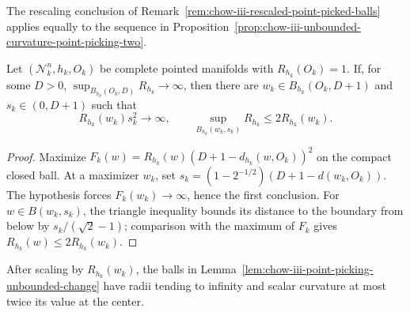 \begin{remark}
\label{rem:chow-iii-improved-point-picking-rescaling}


The rescaling conclusion of
Remark~\ref{rem:chow-iii-rescaled-point-picked-balls} applies equally to the
sequence in Proposition~\ref{prop:chow-iii-unbounded-curvature-point-picking-two}.
\end{remark}

\begin{lemma}
\label{lem:chow-iii-point-picking-unbounded-change}

Let \((\mathcal N_k^n,h_k,O_k)\) be complete pointed manifolds with
\(R_{h_k}(O_k)=1\).  If, for some \(D>0\),
\(\sup_{B_{h_k}(O_k,D)}R_{h_k}\to\infty\), then there are
\(w_k\in B_{h_k}(O_k,D+1)\) and \(s_k\in(0,D+1)\) such that
\[
 R_{h_k}(w_k)s_k^2\to\infty,
 \qquad \sup_{B_{h_k}(w_k,s_k)}R_{h_k}\le2R_{h_k}(w_k).
\]
\end{lemma}
\begin{proof}
\sketch Maximize
\(F_k(w)=R_{h_k}(w)(D+1-d_{h_k}(w,O_k))^2\) on the compact closed ball.
At a maximizer \(w_k\), set
\(s_k=(1-2^{-1/2})(D+1-d(w_k,O_k))\).  The hypothesis forces
\(F_k(w_k)\to\infty\), hence the first conclusion.  For
\(w\in B(w_k,s_k)\), the triangle inequality bounds its distance to the
boundary from below by \(s_k/(\sqrt2-1)\); comparison with the maximum of
\(F_k\) gives \(R_{h_k}(w)\le2R_{h_k}(w_k)\).
\end{proof}

\begin{remark}
\label{rem:chow-iii-unbounded-change-rescaled-balls}


After scaling by \(R_{h_k}(w_k)\), the balls in
Lemma~\ref{lem:chow-iii-point-picking-unbounded-change} have radii tending to
infinity and scalar curvature at most twice its value at the center.
\end{remark}

